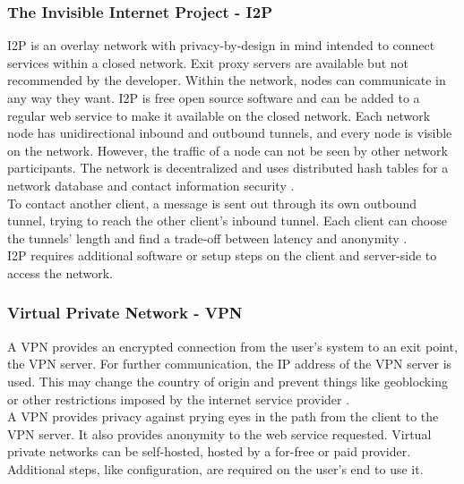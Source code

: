     
    
    \subsubsection{The Invisible Internet Project - I2P}
        I2P is an overlay network with privacy-by-design in mind intended to connect services within a closed network.
        Exit proxy servers are available but not recommended by the developer. Within the network, nodes can communicate in any way they want. I2P is free open source software and can be added to a regular web service to make it available on the closed network. Each network node has unidirectional inbound and outbound tunnels, and every node is visible on the network. However, the traffic of a node can not be seen by other network participants. The network is decentralized and uses distributed hash tables for a network database and contact information security \cite{i2p_intro_2014}.\\
        To contact another client, a message is sent out through its own outbound tunnel, trying to reach the other client's inbound tunnel. Each client can choose the tunnels' length and find a trade-off between latency and anonymity \cite{anoncoin_i2p_2018}.\\
        I2P requires additional software or setup steps on the client and server-side to access the network.\\
        
        
        
    
    \subsubsection{Virtual Private Network - VPN}
        A VPN provides an encrypted connection from the user's system to an exit point, the VPN server. For further communication, the IP address of the VPN server is used. This may change the country of origin and prevent things like geoblocking or other restrictions imposed by the internet service provider \cite{microsoft_virtual_2009}.\\
        A VPN provides privacy against prying eyes in the path from the client to the VPN server. It also provides anonymity to the web service requested. Virtual private networks can be self-hosted, hosted by a for-free or paid provider. Additional steps, like configuration, are required on the user's end to use it.\\

